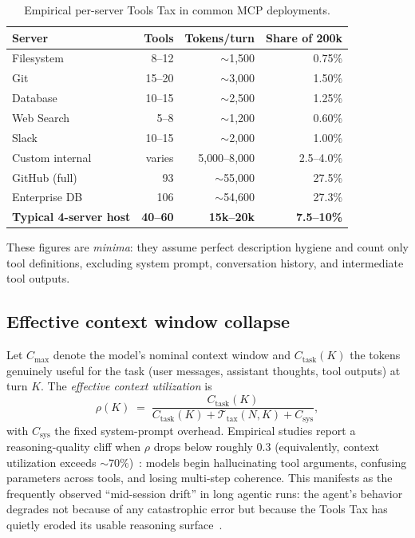 \documentclass[11pt]{article}
\newcommand{\ToolsTax}{\mathcal{T}_{\text{tax}}}
\newcommand{\toprule}{\hline\hline}
\newcommand{\midrule}{\hline}
\newcommand{\bottomrule}{\hline\hline}
\begin{document}
\begin{table}[t]
\centering
\caption{Empirical per-server Tools Tax in common MCP deployments.}
\label{tab:per-server}
\begin{tabular}{lrrr}
\toprule
\textbf{Server} & \textbf{Tools} & \textbf{Tokens/turn} & \textbf{Share of 200k} \\
\midrule
Filesystem      & 8--12   & $\sim$1{,}500       & 0.75\% \\
Git             & 15--20  & $\sim$3{,}000       & 1.50\% \\
Database        & 10--15  & $\sim$2{,}500       & 1.25\% \\
Web Search      & 5--8    & $\sim$1{,}200       & 0.60\% \\
Slack           & 10--15  & $\sim$2{,}000       & 1.00\% \\
Custom internal & varies  & 5{,}000--8{,}000    & 2.5--4.0\% \\
GitHub (full)   & 93      & $\sim$55{,}000      & 27.5\% \\
Enterprise DB   & 106     & $\sim$54{,}600      & 27.3\% \\
\midrule
\textbf{Typical 4-server host} & \textbf{40--60} & \textbf{15k--20k} & \textbf{7.5--10\%} \\
\bottomrule
\end{tabular}
\end{table}

These figures are \emph{minima}: they assume perfect description hygiene and count only tool definitions, excluding system prompt, conversation history, and intermediate tool outputs.

\subsection{Effective context window collapse}

Let $C_{\max}$ denote the model's nominal context window and $C_{\text{task}}(K)$ the tokens genuinely useful for the task (user messages, assistant thoughts, tool outputs) at turn $K$. The \emph{effective context utilization} is
\begin{equation}
\rho(K) \;=\; \frac{C_{\text{task}}(K)}{C_{\text{task}}(K) + \ToolsTax(N,K) + C_{\text{sys}}},
\end{equation}
with $C_{\text{sys}}$ the fixed system-prompt overhead. Empirical studies report a reasoning-quality cliff when $\rho$ drops below roughly $0.3$ (equivalently, context utilization exceeds ${\sim}70\%$)~\citep{pan2026agent,modarressi2025nolima}: models begin hallucinating tool arguments, confusing parameters across tools, and losing multi-step coherence. This manifests as the frequently observed ``mid-session drift'' in long agentic runs: the agent's behavior degrades not because of any catastrophic error but because the Tools Tax has quietly eroded its usable reasoning surface~\citep{pan2026agent,modarressi2025nolima,atlan2026context}.
\end{document}
